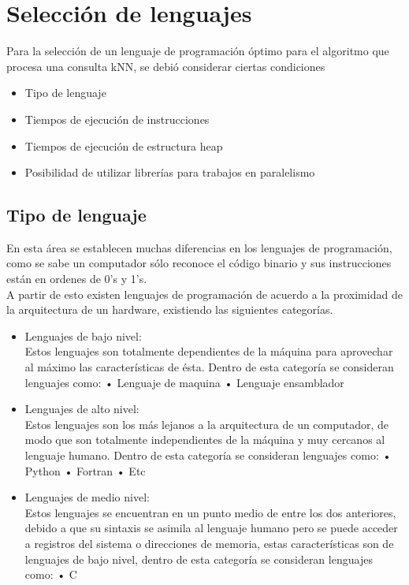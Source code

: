 \section{Selección de lenguajes}

Para la selección de un lenguaje de programación óptimo para el algoritmo que procesa una consulta kNN, se debió considerar ciertas condiciones
\\
\begin{itemize}
\item Tipo de lenguaje
\item Tiempos de ejecución de instrucciones
\item Tiempos de ejecución de estructura heap
\item Posibilidad de utilizar librerías para trabajos en paralelismo
\end{itemize}  

\subsection*{Tipo de lenguaje}
En esta área se establecen muchas diferencias en los lenguajes de programación, como se sabe un computador sólo reconoce el código binario y sus instrucciones están en ordenes de 0's y 1's. \\
A partir de esto existen lenguajes de programación de acuerdo a la proximidad de la arquitectura de un hardware, existiendo las siguientes categorías.

\begin{itemize}
	\item Lenguajes de bajo nivel:\\
	Estos lenguajes son totalmente dependientes de la máquina para aprovechar al máximo las características de ésta. Dentro de esta categoría se consideran lenguajes como:
	\subitem •	 Lenguaje de maquina 
	\subitem •	 Lenguaje ensamblador 

	\item Lenguajes de alto nivel:\\
	Estos lenguajes son los más lejanos a la arquitectura de un computador, de modo que son totalmente independientes de la máquina y muy cercanos al lenguaje humano. Dentro de esta categoría se consideran lenguajes como:
	\subitem •	 Python
	\subitem •	 Fortran
	\subitem •	 Etc
	
	\item Lenguajes de medio nivel:\\
	Estos lenguajes se encuentran en un punto medio de entre los dos anteriores, debido a que su sintaxis se asimila al lenguaje humano pero se puede acceder a registros del sistema o direcciones de memoria, estas características son de lenguajes de bajo nivel, dentro de esta categoría se consideran lenguajes como:
	\subitem •	 C	
\end{itemize}  

